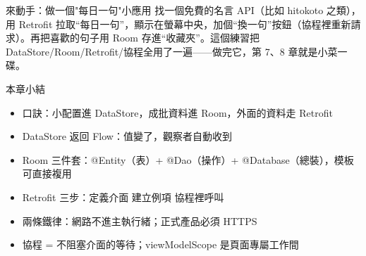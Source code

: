 \begin{tcbpractice}{來動手：做一個"每日一句"小應用}
找一個免費的名言 API（比如 hitokoto 之類），用 Retrofit 拉取“每日一句”，顯示在螢幕中央，加個“換一句”按鈕（協程裡重新請求）。再把喜歡的句子用 Room 存進“收藏夾”。這個練習把 DataStore/Room/Retrofit/協程全用了一遍——做完它，第 7、8 章就是小菜一碟。

\end{tcbpractice}

\begin{tcbsummary}{本章小結}
\begin{itemize}
  \item 口訣：小配置進 DataStore，成批資料進 Room，外面的資料走 Retrofit
  \item DataStore 返回 Flow：值變了，觀察者自動收到
  \item Room 三件套：@Entity（表）+ @Dao（操作）+ @Database（總裝），模板可直接複用
  \item Retrofit 三步：定義介面 建立例項 協程裡呼叫
  \item 兩條鐵律：網路不進主執行緒；正式產品必須 HTTPS
  \item 協程 = 不阻塞介面的等待；viewModelScope 是頁面專屬工作間
\end{itemize}

\end{tcbsummary}
